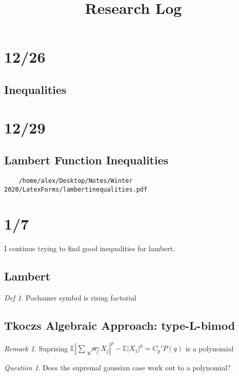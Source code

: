 \documentclass[11pt]{article}
\title{Research Log}
\newcommand{\E}{\mathbb{E}}
\theoremstyle{remark}
\newtheorem*{rem}{Remark}
\newtheorem*{defi}{Def}
\newtheorem*{quest}{Question}
\begin{document}
\maketitle

\section{12/26}

\subsection{Inequalities}

\section{12/29}

\subsection{Lambert Function Inequalities}

\begin{verbatim}
	/home/alex/Desktop/Notes/Winter 2020/LatexForms/lambertinequalities.pdf
\end{verbatim}

\section{1/7}

I continue trying to find good inequalities for lambert.

\subsection{Lambert}

\begin{defi}
	Pochamer symbol is rising factorial
\end{defi}

\subsection{Tkoczs Algebraic Approach: type-L-bimod}

\begin{rem}
	Suprising $\E|\sum \sqrt{a_j} X_j|^p - \E |X_1|^p = C_p' P(q)$ is a polynomial
\end{rem}

\begin{quest}
	Does the supremal gaussian case work out to a polynomial?
\end{quest}
\end{document}
